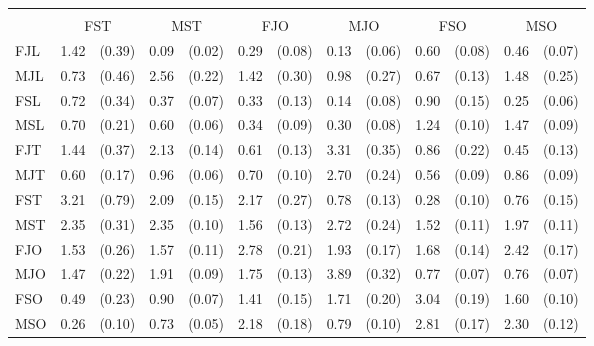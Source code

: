 \begin{tabular}{ll@{\,\,\,}rl@{\,\,\,}rl@{\,\,\,}rl@{\,\,\,}rl@{\,\,\,}rl@{\,\,\,}r}
\phantom{\textbf{Receiver}} &\\
    & \multicolumn{2}{c}{\textnormal{FST}}
    & \multicolumn{2}{c}{\textnormal{MST}}
    & \multicolumn{2}{c}{\textnormal{FJO}}
    & \multicolumn{2}{c}{\textnormal{MJO}}
    & \multicolumn{2}{c}{\textnormal{FSO}}
    & \multicolumn{2}{c}{\textnormal{MSO}} \\
    \cmidrule(lr){2-3}
    \cmidrule(lr){4-5}
    \cmidrule(lr){6-7}
    \cmidrule(lr){8-9}
    \cmidrule(lr){10-11}
    \cmidrule(lr){12-13}
    \textnormal{FJL} & 1.42 & (0.39) & 0.09 & (0.02) & 0.29 & (0.08) & 0.13 & (0.06) & 0.60 & (0.08) & 0.46 & (0.07) \\
    \textnormal{MJL} & 0.73 & (0.46) & 2.56 & (0.22) & 1.42 & (0.30) & 0.98 & (0.27) & 0.67 & (0.13) & 1.48 & (0.25) \\
    \textnormal{FSL} & 0.72 & (0.34) & 0.37 & (0.07) & 0.33 & (0.13) & 0.14 & (0.08) & 0.90 & (0.15) & 0.25 & (0.06) \\
    \textnormal{MSL} & 0.70 & (0.21) & 0.60 & (0.06) & 0.34 & (0.09) & 0.30 & (0.08) & 1.24 & (0.10) & 1.47 & (0.09) \\
    \textnormal{FJT} & 1.44 & (0.37) & 2.13 & (0.14) & 0.61 & (0.13) & 3.31 & (0.35) & 0.86 & (0.22) & 0.45 & (0.13) \\
    \textnormal{MJT} & 0.60 & (0.17) & 0.96 & (0.06) & 0.70 & (0.10) & 2.70 & (0.24) & 0.56 & (0.09) & 0.86 & (0.09) \\
    \textnormal{FST} & 3.21 & (0.79) & 2.09 & (0.15) & 2.17 & (0.27) & 0.78 & (0.13) & 0.28 & (0.10) & 0.76 & (0.15) \\
    \textnormal{MST} & 2.35 & (0.31) & 2.35 & (0.10) & 1.56 & (0.13) & 2.72 & (0.24) & 1.52 & (0.11) & 1.97 & (0.11) \\
    \textnormal{FJO} & 1.53 & (0.26) & 1.57 & (0.11) & 2.78 & (0.21) & 1.93 & (0.17) & 1.68 & (0.14) & 2.42 & (0.17) \\
    \textnormal{MJO} & 1.47 & (0.22) & 1.91 & (0.09) & 1.75 & (0.13) & 3.89 & (0.32) & 0.77 & (0.07) & 0.76 & (0.07) \\
    \textnormal{FSO} & 0.49 & (0.23) & 0.90 & (0.07) & 1.41 & (0.15) & 1.71 & (0.20) & 3.04 & (0.19) & 1.60 & (0.10) \\
    \textnormal{MSO} & 0.26 & (0.10) & 0.73 & (0.05) & 2.18 & (0.18) & 0.79 & (0.10) & 2.81 & (0.17) & 2.30 & (0.12) \\
\bottomrule
\end{tabular}